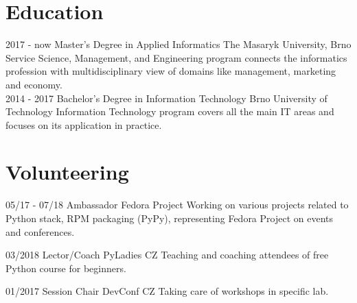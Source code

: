 \documentclass[]{friggeri-cv}
\begin{document}
\section{Education}
\begin{entrylist}
  \entry
    {2017 - now}
    {Master's Degree in Applied Informatics}
    {The Masaryk University, Brno}
    {Service Science, Management, and Engineering program connects the informatics profession with
    multidisciplinary view of domains like management, marketing and economy.\\}
  \entry
    {2014 - 2017}
    {Bachelor's Degree in Information Technology}
    {Brno University of Technology}
    {Information Technology program covers all the main IT areas and focuses on its application in practice.\\}
\end{entrylist}

\section{Volunteering}
\begin{entrylist}
    \entry
    {05/17 - 07/18}
    {Ambassador}
    {Fedora Project}
    {Working on various projects related to Python stack, RPM packaging (PyPy), representing Fedora
    Project on events and conferences.\\}

  \entry
    {03/2018}
    {Lector/Coach}
    {PyLadies CZ}
    {Teaching and coaching attendees of free Python course for beginners.\\}

  \entry
    {01/2017}
    {Session Chair}
    {DevConf CZ}
    {Taking care of workshops in specific lab.\\}
\end{entrylist}

\end{document}
